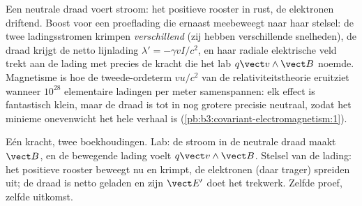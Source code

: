 \begin{example}\label{ex:b3:covariant-electromagnetism:wire}
Een neutrale draad voert stroom: het positieve rooster in rust, de
elektronen driftend. Boost voor een proeflading die ernaast meebeweegt
naar haar stelsel: de twee ladingsstromen krimpen \emph{verschillend} (zij
hebben verschillende snelheden), de draad krijgt de netto lijnlading
$\lambda' =
-\gamma vI/c^2$, en haar radiale elektrische veld trekt aan de
lading met precies de kracht die het lab $q\vect v\wedge\vect B$ noemde.
Magnetisme is hoe de tweede-ordeterm $v u/c^2$ van de
relativiteitstheorie eruitziet wanneer $10^{28}$ elementaire ladingen per
meter samenspannen: elk effect is fantastisch klein, maar de draad is tot
in nog grotere precisie neutraal, zodat het minieme onevenwicht het hele
verhaal is (\cref{pb:b3:covariant-electromagnetism:1}).
\end{example}

\begin{omfigure}

{\small Eén kracht, twee boekhoudingen. Lab: de stroom in de neutrale
draad maakt $\vect B$, en de bewegende lading voelt $q\vect v\wedge\vect B$. Stelsel van de lading: het positieve rooster beweegt nu en krimpt, de
elektronen (daar trager) spreiden uit; de draad is netto geladen en zijn
$\vect E'$ doet het trekwerk. Zelfde proef, zelfde uitkomst.}
\end{omfigure}

